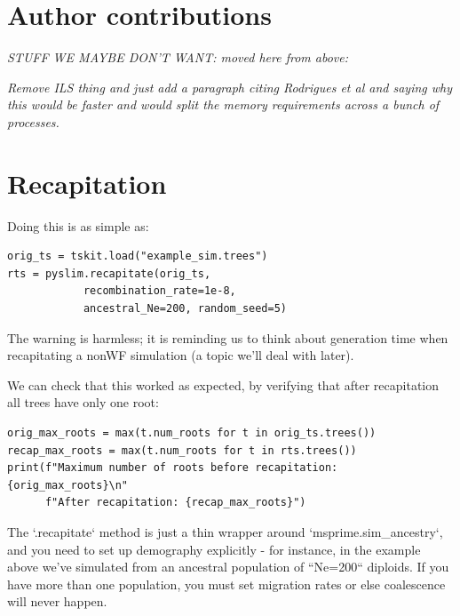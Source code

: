 \documentclass[12pt]{article}
\newcommand{\comment}[1]{\textit{\color{green} #1}}
\begin{document}
\section*{Author contributions}




\newpage
\appendix

\comment{STUFF WE MAYBE DON'T WANT: moved here from above:}

\comment{Remove ILS thing and just add a paragraph citing Rodrigues et al and saying why this would be faster and would split the memory requirements across a bunch of processes.}

\section{Recapitation}


Doing this is as simple as:

\begin{verbatim}
orig_ts = tskit.load("example_sim.trees")
rts = pyslim.recapitate(orig_ts,
            recombination_rate=1e-8,
            ancestral_Ne=200, random_seed=5)
\end{verbatim}
The warning is harmless; it is reminding us to think about generation time
when recapitating a nonWF simulation (a topic we'll deal with later).

We can check that this worked as expected, by verifying that after recapitation
all trees have only one root:
\begin{verbatim}
orig_max_roots = max(t.num_roots for t in orig_ts.trees())
recap_max_roots = max(t.num_roots for t in rts.trees())
print(f"Maximum number of roots before recapitation: {orig_max_roots}\n"
      f"After recapitation: {recap_max_roots}")
\end{verbatim}

The `.recapitate` method
is just a thin wrapper around `msprime.sim\_ancestry`,
and you need to set up demography explicitly - for instance, in the example above
we've simulated from an ancestral population of ``Ne=200`` diploids.
If you have more than one population,
you must set migration rates or else coalescence will never happen.
\end{document}
